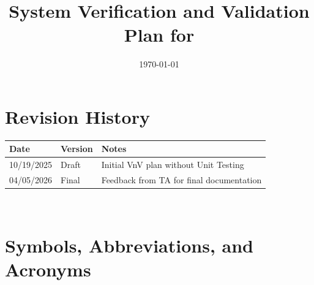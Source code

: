 \documentclass[12pt, titlepage]{article}
\begin{document}
\title{System Verification and Validation Plan for \progname{}} 
\author{\authname}
\date{\today}
	
\maketitle


\section*{Revision History}

\begin{tabularx}{\textwidth}{p{3cm}p{2cm}X}
\toprule {\bf Date} & {\bf Version} & {\bf Notes}\\
\midrule
10/19/2025 & Draft & Initial VnV plan without Unit Testing\\
04/05/2026 & Final & Feedback from TA for final documentation\\
\bottomrule
\end{tabularx}

~\\

\newpage

\tableofcontents

\listoftables




\newpage



\hypertarget{glossary-catan}{}
\hypertarget{glossary-ai}{}
\hypertarget{glossary-rl}{}
\hypertarget{glossary-dt}{}
\hypertarget{glossary-cv}{}
\hypertarget{glossary-llm}{}
\hypertarget{glossary-gamestate}{}
\hypertarget{glossary-nfr}{}
\hypertarget{glossary-fr}{}

\newcommand{\Catan}{\hyperlink{glossary-catan}{Catan}}
\newcommand{\AI}{\hyperlink{glossary-ai}{AI}}
\newcommand{\RL}{\hyperlink{glossary-rl}{RL}}
\newcommand{\DigitalTwin}{\hyperlink{glossary-dt}{Digital Twin}}
\newcommand{\CV}{\hyperlink{glossary-cv}{CV}}
\newcommand{\LLM}{\hyperlink{glossary-llm}{LLM}}
\newcommand{\GameState}{\hyperlink{glossary-gamestate}{Game State}}
\newcommand{\NFR}{\hyperlink{glossary-nfr}{NFR}}
\newcommand{\FR}{\hyperlink{glossary-fr}{FR}}

\section{Symbols, Abbreviations, and Acronyms}
\end{document}
